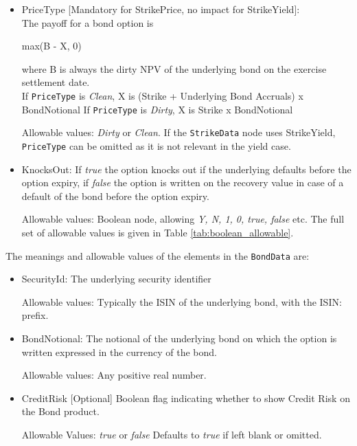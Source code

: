 \begin{itemize}
  
  
    \item PriceType [Mandatory for StrikePrice, no impact for StrikeYield]: \\
    The payoff for a bond option is
  
	max(B - X, 0) 

    where B is always the dirty NPV of the underlying bond on the exercise settlement date. \\
    If \lstinline!PriceType!  is \emph{Clean}, X is  (Strike + Underlying Bond Accruals) x BondNotional 
    If \lstinline!PriceType!  is \emph{Dirty}, X is Strike x BondNotional 
    
    Allowable values: \emph{Dirty} or \emph{Clean}. If the \lstinline!StrikeData! node uses StrikeYield, \lstinline!PriceType! can be omitted as it is not relevant in the yield case.
  \item KnocksOut: If \emph{true} the option knocks out if the underlying defaults before the option expiry, if \emph{false} the
    option is written on the recovery value in case of a default of the bond before the option expiry.
    
Allowable values: Boolean node, allowing \emph{Y, N, 1, 0, true, false} etc. The full set of allowable values is given in Table \ref{tab:boolean_allowable}.    
    
\end{itemize}

The meanings and allowable values of the elements in the \lstinline!BondData! are:

\begin{itemize}
  \item SecurityId: The underlying security identifier

      Allowable values:  Typically the ISIN of the underlying bond, with the ISIN: prefix. 
  \item BondNotional: The notional of the underlying bond on which the option is written expressed in the currency of the bond.

      Allowable values:  Any positive real number.
    \item CreditRisk [Optional] Boolean flag indicating whether to show Credit Risk on the Bond product.
    
      Allowable Values: \emph{true} or \emph{false} Defaults to \emph{true} if left blank or omitted.          
\end{itemize}
